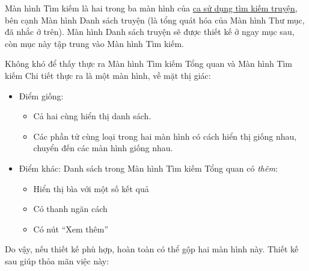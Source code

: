 \documentclass[../../../../thesis]{subfiles}
\begin{document}
Màn hình Tìm kiếm là hai trong ba màn hình của \hyperref[sec:search-comic]{ca sử
dụng tìm kiếm truyện}, bên cạnh Màn hình Danh sách truyện (là tổng quát hóa của
Màn hình Thư mục, đã nhắc ở trên). Màn hình Danh sách truyện sẽ được thiết kế ở
ngay mục sau, còn mục này tập trung vào Màn hình Tìm kiếm.

Không khó để thấy thực ra Màn hình Tìm kiếm Tổng quan và Màn hình Tìm kiếm Chi
tiết thực ra là một màn hình, về mặt thị giác:

\begin{itemize}
    \item
        Điểm giống:

        \begin{itemize}
            \item
                Cả hai cùng hiển thị danh sách.
            \item
                Các phần tử cùng loại trong hai màn hình có cách hiển thị giống
                nhau, chuyển đến các màn hình giống nhau.
        \end{itemize}
    \item
        Điểm khác: Danh sách trong Màn hình Tìm kiếm Tổng quan có \emph{thêm}:

        \begin{itemize}
            \item
                Hiển thị bìa với một số kết quả
            \item
                Có thanh ngăn cách
            \item
                Có nút ``Xem thêm''
        \end{itemize}
\end{itemize}

Do vậy, nếu thiết kế phù hợp, hoàn toàn có thể gộp hai màn hình này. Thiết kế
sau giúp thỏa mãn việc này:
\end{document}
